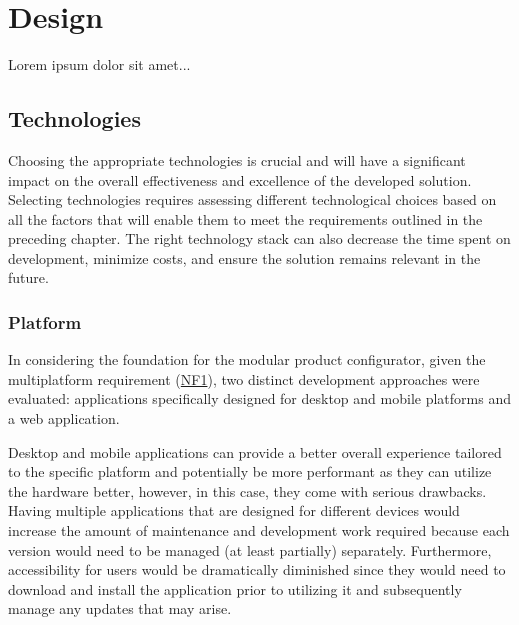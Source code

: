 \chapter{Design}

\begin{chapterabstract}
Lorem ipsum dolor sit amet...
\end{chapterabstract}

\section{Technologies}

Choosing the appropriate technologies is crucial and will have a significant impact on the overall effectiveness and excellence of the developed solution. Selecting technologies requires assessing different technological choices based on all the factors that will enable them to meet the requirements outlined in the preceding chapter. The right technology stack can also decrease the time spent on development, minimize costs, and ensure the solution remains relevant in the future.

\subsection{Platform}

In considering the foundation for the modular product configurator, given the multiplatform requirement (\hyperref[itm:NF1]{NF1}), two distinct development approaches were evaluated: applications specifically designed for desktop and mobile platforms and a web application.

Desktop and mobile applications can provide a better overall experience tailored to the specific platform and potentially be more performant as they can utilize the hardware better, however, in this case, they come with serious drawbacks. Having multiple applications that are designed for different devices would increase the amount of maintenance and development work required because each version would need to be managed (at least partially) separately. Furthermore, accessibility for users would be dramatically diminished since they would need to download and install the application prior to utilizing it and subsequently manage any updates that may arise.

